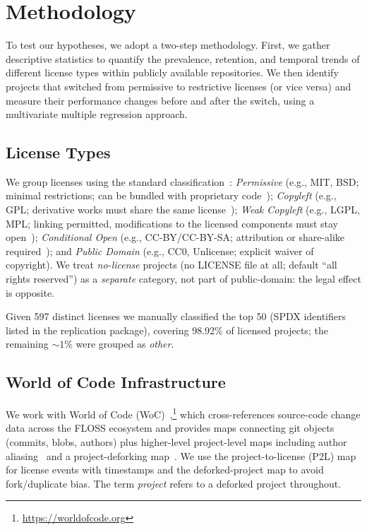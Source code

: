 \section{Methodology}\label{method}

To test our hypotheses, we adopt a two-step methodology.
First, we gather descriptive statistics to quantify the prevalence, retention, 
and temporal trends of different license types within publicly available repositories.
We then identify projects that switched from permissive to restrictive 
licenses (or vice versa) and measure their performance changes before and after 
the switch, using a multivariate multiple regression approach.

\subsection{License Types}

We group licenses using the standard classification~\cite{kaminski2007open}:
\emph{Permissive} (e.g., MIT, BSD; minimal restrictions; can be bundled
with proprietary code~\cite{kapitsaki2019modeling,kapitsaki2022help});
\emph{Copyleft} (e.g., GPL; derivative works must share the same
license~\cite{d2007copyleft,laurent2012free});
\emph{Weak Copyleft} (e.g., LGPL, MPL; linking permitted, modifications
to the licensed components must stay
open~\cite{alamoudi2020open,gamalielsson2017licensing});
\emph{Conditional Open} (e.g., CC-BY/CC-BY-SA; attribution or
share-alike required~\cite{de2009creative}); and
\emph{Public Domain} (e.g., CC0, Unlicense; explicit waiver of
copyright). We treat \emph{no-license} projects (no LICENSE file at
all; default ``all rights reserved'') as a \emph{separate} category,
not part of public-domain: the legal effect is opposite.

Given 597 distinct licenses we manually classified the top 50 (SPDX
identifiers listed in the replication package),
covering 98.92\% of licensed projects; the remaining $\sim 1\%$ were grouped as
\emph{other}.

\subsection{World of Code Infrastructure}

We work with World of Code
(WoC)~\cite{ma2019world,ma2021world},\footnote{\url{https://worldofcode.org}}
which cross-references source-code change data across the FLOSS
ecosystem and provides maps connecting git objects (commits, blobs,
authors) plus higher-level project-level maps including author
aliasing~\cite{fry2020dataset} and a project-deforking
map~\cite{mockus2020complete}. We use the project-to-license (P2L)
map~\cite{jahanshahi2024license} for license events with timestamps
and the deforked-project map to avoid fork/duplicate bias. The term
\emph{project} refers to a deforked project throughout.

